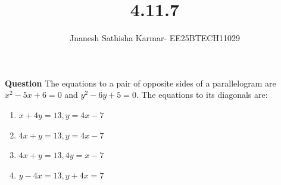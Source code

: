 \documentclass[journal]{IEEEtran}
\theoremstyle{remark}
\begin{document}
\setlength{\abovedisplayskip}{0pt}
\setlength{\belowdisplayskip}{0pt}
\setlength{\abovedisplayshortskip}{0pt}
\setlength{\belowdisplayshortskip}{0pt}

\onecolumn

\title{4.11.7}
\author{Jnanesh Sathisha Karmar- EE25BTECH11029}
\maketitle


\renewcommand{\thefigure}{\theenumi}
\renewcommand{\thetable}{\theenumi}

\textbf{Question} The equations to a pair of opposite sides of a parallelogram are $x^2 - 5x + 6 = 0$ and $y^2 - 6y + 5 = 0$. The equations to its diagonals are:
\begin{multicols}{2}
\begin{enumerate}
    \item $x+4y=13, y=4x-7$
    \item $4x+y=13, y=4x-7$
    \item $4x+y=13, 4y=x-7$
    \item $y-4x=13, y+4x=7$
\end{enumerate}
\end{multicols}
\end{document}
